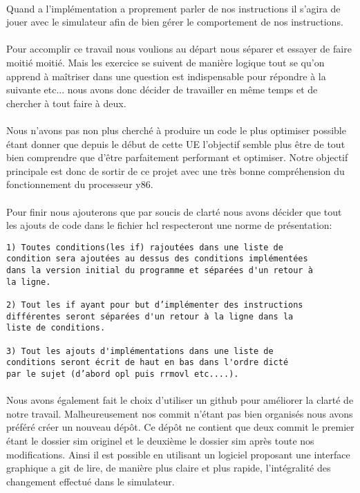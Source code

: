 \documentclass[12pt]{article}
\begin{document}
\paragraph{} Quand a l’implémentation a proprement parler de nos instructions il
s’agira de jouer avec le simulateur afin de bien gérer le comportement de nos instructions.

\paragraph{} Pour accomplir ce travail nous voulions au départ nous séparer et essayer de faire moitié moitié. Mais les exercice se suivent de manière logique tout se qu'on apprend à maîtriser dans une question est indispensable pour répondre à la suivante etc... nous avons donc décider de travailler en même temps et de chercher à tout faire à deux.

\paragraph{} Nous n'avons pas non plus cherché à produire un code le plus optimiser possible étant donner que depuis le début de cette UE l'objectif semble plus être de tout bien comprendre que d’être parfaitement performant et optimiser. Notre objectif principale est donc de sortir de ce projet avec une très bonne compréhension du fonctionnement du processeur y86.

\paragraph{} Pour finir nous ajouterons que par soucis de clarté nous avons décider que tout les ajouts de code dans le fichier hcl respecteront une norme de présentation:
\begin{verbatim}
1) Toutes conditions(les if) rajoutées dans une liste de 
condition sera ajoutées au dessus des conditions implémentées 
dans la version initial du programme et séparées d'un retour à 
la ligne.

2) Tout les if ayant pour but d’implémenter des instructions
différentes seront séparées d'un retour à la ligne dans la 
liste de conditions.

3) Tout les ajouts d'implémentations dans une liste de 
conditions seront écrit de haut en bas dans l'ordre dicté 
par le sujet (d’abord opl puis rrmovl etc....).
\end{verbatim}

\paragraph{} Nous avons également fait le choix d'utiliser un github pour améliorer la clarté de notre travail. Malheureusement nos commit n'étant pas bien organisés nous avons préféré créer un nouveau dépôt. Ce dépôt ne contient que deux commit le premier étant le dossier sim originel et le deuxième le dossier sim après toute nos modifications. Ainsi il est possible en utilisant un logiciel proposant une interface graphique a git de lire, de manière plus claire et plus rapide, l'intégralité des changement effectué dans le simulateur.
\end{document}
